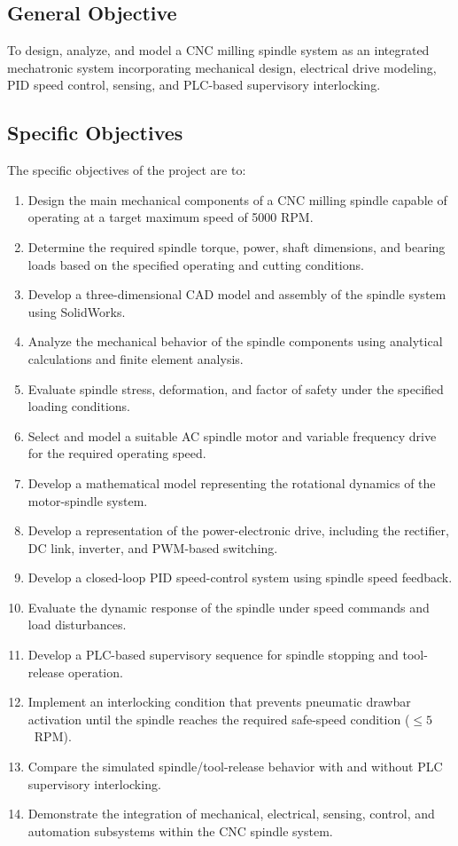 \documentclass[12pt,a4paper]{report}
\begin{document}
	\subsection{General Objective}
	To design, analyze, and model a CNC milling spindle system as an integrated mechatronic system incorporating mechanical design, electrical drive modeling, PID speed control, sensing, and PLC-based supervisory interlocking.
	
	\subsection{Specific Objectives}
	The specific objectives of the project are to:
	\begin{enumerate}[label=\arabic*.]
		\item Design the main mechanical components of a CNC milling spindle capable of operating at a target maximum speed of 5000 RPM.
		\item Determine the required spindle torque, power, shaft dimensions, and bearing loads based on the specified operating and cutting conditions.
		\item Develop a three-dimensional CAD model and assembly of the spindle system using SolidWorks.
		\item Analyze the mechanical behavior of the spindle components using analytical calculations and finite element analysis.
		\item Evaluate spindle stress, deformation, and factor of safety under the specified loading conditions.
		\item Select and model a suitable AC spindle motor and variable frequency drive for the required operating speed.
		\item Develop a mathematical model representing the rotational dynamics of the motor-spindle system.
		\item Develop a representation of the power-electronic drive, including the rectifier, DC link, inverter, and PWM-based switching.
		\item Develop a closed-loop PID speed-control system using spindle speed feedback.
		\item Evaluate the dynamic response of the spindle under speed commands and load disturbances.
		\item Develop a PLC-based supervisory sequence for spindle stopping and tool-release operation.
		\item Implement an interlocking condition that prevents pneumatic drawbar activation until the spindle reaches the required safe-speed condition ($\leq 5$~RPM).
		\item Compare the simulated spindle/tool-release behavior with and without PLC supervisory interlocking.
		\item Demonstrate the integration of mechanical, electrical, sensing, control, and automation subsystems within the CNC spindle system.
	\end{enumerate}
	
\end{document}
